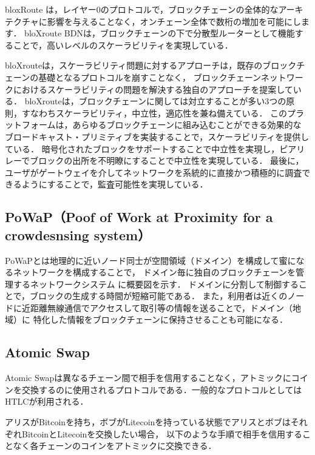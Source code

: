 \documentclass[a4paper,12pt]{jsarticle}
\begin{document}
bloxRoute は，レイヤー0のプロトコルで，ブロックチェーンの全体的なアーキテクチャに影響を与えることなく，オンチェーン全体で数桁の増加を可能にします．
bloXroute BDNは，ブロックチェーンの下で分散型ルーターとして機能することで，高いレベルのスケーラビリティを実現している．

bloXrouteは，スケーラビリティ問題に対するアプローチは，既存のブロックチェーンの基礎となるプロトコルを崩すことなく，
ブロックチェーンネットワークにおけるスケーラビリティの問題を解決する独自のアプローチを提案している．
bloXrouteは，ブロックチェーンに関しては対立することが多い3つの原則，すなわちスケーラビリティ，中立性，適応性を兼ね備えている．
このプラットフォームは，あらゆるブロックチェーンに組み込むことができる効果的な
ブロードキャスト・プリミティブを実装することで，スケーラビリティを提供している．
暗号化されたブロックをサポートすることで中立性を実現し，ピアリレーでブロックの出所を不明瞭にすることで中立性を実現している．
最後に，ユーザがゲートウェイを介してネットワークを系統的に直接かつ積極的に調査できるようにすることで，監査可能性を実現している．

\subsection{PoWaP（Poof of Work at Proximity for a crowdesnsing system）}
PoWaPとは地理的に近いノード同士が空間領域（ドメイン）を構成して蜜になるネットワークを構成することで，
ドメイン毎に独自のブロックチェーンを管理するネットワークシステム\cite{DomainSplit} に概要図を示す．
ドメインに分割して制御することで，ブロックの生成する時間が短縮可能である．
また，利用者は近くのノードに近距離無線通信でアクセスして取引等の情報を送ることで，ドメイン（地域）に
特化した情報をブロックチェーンに保持させることも可能になる．

\subsection{Atomic Swap}

Atomic Swapは異なるチェーン間で相手を信用することなく，アトミックにコインを交換するのに使用されるプロトコルである．一般的なプロトコルとしてはHTLCが利用される．

アリスがBitcoinを持ち，ボブがLitecoinを持っている状態でアリスとボブはそれぞれBitcoinとLitecoinを交換したい場合，
以下のような手順で相手を信用することなく各チェーンのコインをアトミックに交換できる．
\end{document}
